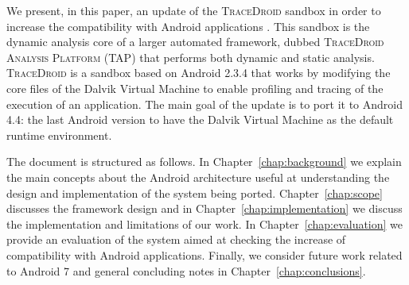 We present, in this paper, an update of the \textsc{TraceDroid} sandbox in
order to increase the compatibility with Android applications
\cite{ref1}. This sandbox is the dynamic analysis core of a larger
automated framework, dubbed \textsc{TraceDroid Analysis Platform (TAP)}
that performs both dynamic and static analysis. \textsc{TraceDroid} is a sandbox based on Android 2.3.4 that works
by modifying the core files of the Dalvik Virtual Machine to enable
profiling and tracing of the execution of an application. The
main goal of the update is to port it to Android 4.4: the last Android
version to have the Dalvik Virtual Machine as the default runtime
environment.

The document is structured as follows. In
Chapter~\ref{chap:background} we explain the main concepts about the
Android architecture useful at understanding the design and
implementation of the system being ported. Chapter~\ref{chap:scope}
discusses the framework design and in
Chapter~\ref{chap:implementation} we discuss the implementation and
limitations of our work. In Chapter~\ref{chap:evaluation} we provide
an evaluation of the system aimed at checking the increase of
compatibility with Android applications. Finally, we consider future
work related to Android 7 and general concluding notes in
Chapter~\ref{chap:conclusions}.
